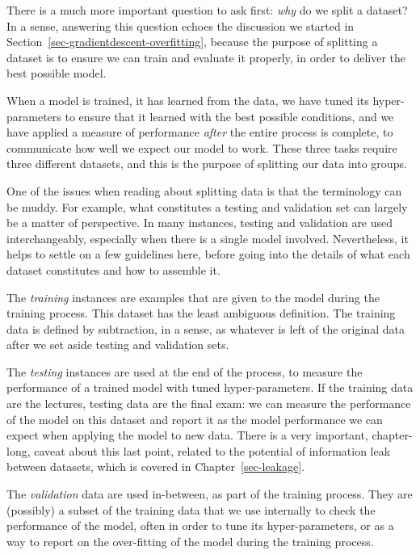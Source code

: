 \documentclass[
  letterpaper,
]{scrbook}
\begin{document}
There is a much more important question to ask first: \emph{why} do we
split a dataset? In a sense, answering this question echoes the
discussion we started in Section~\ref{sec-gradientdescent-overfitting},
because the purpose of splitting a dataset is to ensure we can train and
evaluate it properly, in order to deliver the best possible model.

When a model is trained, it has learned from the data, we have tuned its
hyper-parameters to ensure that it learned with the best possible
conditions, and we have applied a measure of performance \emph{after}
the entire process is complete, to communicate how well we expect our
model to work. These three tasks require three different datasets, and
this is the purpose of splitting our data into groups.

One of the issues when reading about splitting data is that the
terminology can be muddy. For example, what constitutes a testing and
validation set can largely be a matter of perspective. In many
instances, testing and validation are used interchangeably, especially
when there is a single model involved. Nevertheless, it helps to settle
on a few guidelines here, before going into the details of what each
dataset constitutes and how to assemble it.

The \emph{training} instances are examples that are given to the model
during the training process. This dataset has the least ambiguous
definition. The training data is defined by subtraction, in a sense, as
whatever is left of the original data after we set aside testing and
validation sets.

The \emph{testing} instances are used at the end of the process, to
measure the performance of a trained model with tuned hyper-parameters.
If the training data are the lectures, testing data are the final exam:
we can measure the performance of the model on this dataset and report
it as the model performance we can expect when applying the model to new
data. There is a very important, chapter-long, caveat about this last
point, related to the potential of information leak between datasets,
which is covered in Chapter~\ref{sec-leakage}.

The \emph{validation} data are used in-between, as part of the training
process. They are (possibly) a subset of the training data that we use
internally to check the performance of the model, often in order to tune
its hyper-parameters, or as a way to report on the over-fitting of the
model during the training process.
\end{document}
